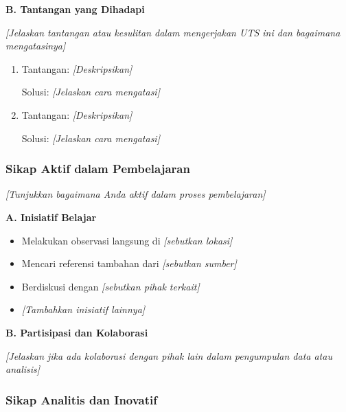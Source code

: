 \vspace{0.5cm}

\textbf{B. Tantangan yang Dihadapi}

\textit{[Jelaskan tantangan atau kesulitan dalam mengerjakan UTS ini dan bagaimana mengatasinya]}

\begin{enumerate}
    \item Tantangan: \textit{[Deskripsikan]}
    
    Solusi: \textit{[Jelaskan cara mengatasi]}
    
    \item Tantangan: \textit{[Deskripsikan]}
    
    Solusi: \textit{[Jelaskan cara mengatasi]}
\end{enumerate}

\vspace{0.5cm}

\subsubsection{Sikap Aktif dalam Pembelajaran}

\textit{[Tunjukkan bagaimana Anda aktif dalam proses pembelajaran]}

\textbf{A. Inisiatif Belajar}

\begin{itemize}
    \item Melakukan observasi langsung di \textit{[sebutkan lokasi]}
    \item Mencari referensi tambahan dari \textit{[sebutkan sumber]}
    \item Berdiskusi dengan \textit{[sebutkan pihak terkait]}
    \item \textit{[Tambahkan inisiatif lainnya]}
\end{itemize}

\vspace{0.5cm}

\textbf{B. Partisipasi dan Kolaborasi}

\textit{[Jelaskan jika ada kolaborasi dengan pihak lain dalam pengumpulan data atau analisis]}

\vspace{0.5cm}

\subsubsection{Sikap Analitis dan Inovatif}


